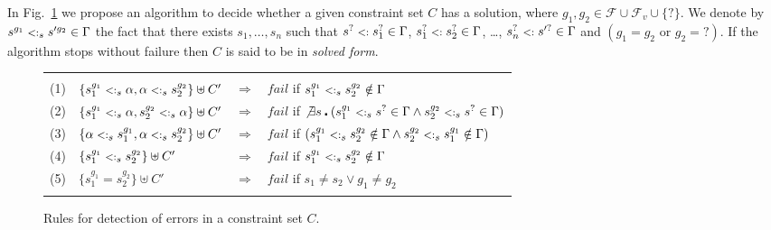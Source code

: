\documentclass{eptcs}
\newcommand{\caF}{\ensuremath{\mathcal{F}}\xspace}
\newcommand{\CC}{\ensuremath{C}\xspace}
\newcommand{\sub}{\mathrel{\mbox{{\footnotesize $<:$}}}}
\begin{document}
In Fig.~\ref{fig:fail_rules} we propose an algorithm to decide whether a given
constraint set $\CC$ has a solution, where $g_1, g_2 \in \caF\cup\caF_v\cup\{?\}$. 
We denote by $s^{g_1} \sub_s s'^{g_2} \in \Gamma$ the fact that there exists $s_1,\ldots,s_n$ such that 
$s^?\sub s_1^?\in\Gamma$, 
$s_1^?\sub s_2^?\in\Gamma$, \ldots,
$s_n^?\sub s'^?\in\Gamma$ and $(g_1=g_2 \textrm{ or } g_2=?)$.
If the algorithm stops without failure then $\CC$ is said to
be in {\em solved form}. 
\begin{figure}[h!]
\begin{center}

\begin{tabular}{|clcl|}
        \hline
                &       &       &       \\
        (1)     & $\{s_1^{g_1} \sub_s \alpha , \alpha \sub_s s_2^{g_2}\} \uplus \CC'$
                & $\Longrightarrow$     
                & $fail$ if $s_1^{g_1} \sub_s s_2^{g_2} \notin \Gamma$  \\
        (2)     & $\{s_1^{g_1} \sub_s \alpha , s_2^{g_2} \sub_s \alpha\} \uplus \CC'$
                & $\Longrightarrow$     
                & $fail$ if $\not\exists s 
                                \centerdot (s_1^{g_1} \sub_s s^? \in \Gamma 
                                \wedge s_2^{g_2} \sub_s s^? \in \Gamma)$  \\
        (3)     & $\{\alpha \sub_s s_1^{g_1}, \alpha \sub_s s_2^{g_2}\} \uplus \CC'$
                & $\Longrightarrow$     
                & $fail$ if $(s_1^{g_1} \sub_s s_2^{g_2} \notin \Gamma
                         \wedge s_2^{g_2} \sub_s s_1^{g_1} \notin \Gamma)$   \\
        (4)     & $\{s_1^{g_1} \sub_s s_2^{g_2}\} \uplus \CC'$  
                & $\Longrightarrow$     
                & $fail$ if $s_1^{g_1} \sub_s s_2^{g_2} \notin \Gamma$ \\
        (5)     & $\{s_1^{g_1} = s_2^{g_2}\} \uplus \CC'$  
                & $\Longrightarrow$     
                & $fail$ if $s_1 \neq s_2 \vee g_1\neq g_2$ \\
                &       &       &       \\
        \hline
\end{tabular}
\end{center}
\caption{Rules for detection of errors in a constraint set $\CC$.}
\label{fig:fail_rules}
\end{figure}
\end{document}
